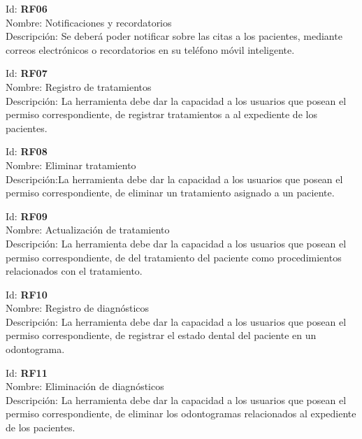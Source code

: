 \vspace{1em}

\noindent Id:  \textbf{RF06}\\
Nombre: Notificaciones y recordatorios\\
Descripción: Se deberá poder notificar sobre las citas a los pacientes, mediante correos electrónicos o recordatorios en su teléfono móvil inteligente.

\vspace{1em}

\noindent Id:  \textbf{RF07}\\
Nombre: Registro de tratamientos\\
Descripción: La herramienta debe dar la capacidad a los usuarios que posean el permiso correspondiente, de registrar tratamientos a al expediente de los pacientes.

\vspace{1em}

\noindent Id:  \textbf{RF08}\\
Nombre: Eliminar tratamiento\\
Descripción:La herramienta debe dar la capacidad a los usuarios que posean el permiso correspondiente, de eliminar un tratamiento asignado a un paciente.

\vspace{1em}

\noindent Id:  \textbf{RF09}\\
Nombre: Actualización de tratamiento\\
Descripción: La herramienta debe dar la capacidad a los usuarios que posean el permiso correspondiente, de del tratamiento del paciente como procedimientos relacionados con el tratamiento.

\vspace{1em}


\noindent Id:  \textbf{RF10}\\
Nombre: Registro de diagnósticos\\
Descripción: La herramienta debe dar la capacidad a los usuarios que posean el permiso correspondiente, de registrar el estado dental del paciente en un odontograma.

\vspace{1em}

\noindent Id:  \textbf{RF11}\\
Nombre: Eliminación de diagnósticos\\
Descripción:  La herramienta debe dar la capacidad a los usuarios que posean el permiso correspondiente, de eliminar los odontogramas relacionados al expediente de los pacientes.

